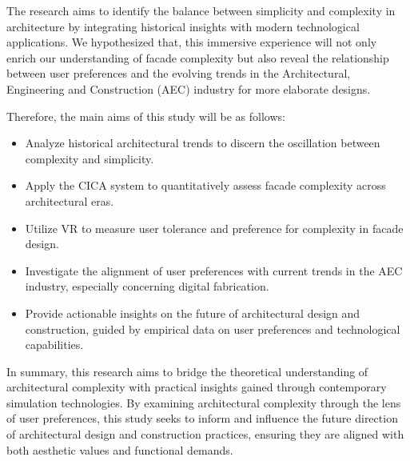 The research aims to identify the balance between simplicity and complexity in architecture by integrating historical insights with modern technological applications.
We hypothesized that, this immersive experience will not only enrich our understanding of facade complexity but also reveal the relationship between user preferences and the evolving trends in the Architectural, Engineering and Construction (AEC) industry for more elaborate designs.

Therefore, the main aims of this study will be as follows:

\begin{itemize}
    \item Analyze historical architectural trends to discern the oscillation between complexity and simplicity.
    \item Apply the CICA system to quantitatively assess facade complexity across architectural eras.
    \item Utilize VR to measure user tolerance and preference for complexity in facade design.
    \item Investigate the alignment of user preferences with current trends in the AEC industry, especially concerning digital fabrication.
    \item Provide actionable insights on the future of architectural design and construction, guided by empirical data on user preferences and technological capabilities.
\end{itemize}



In summary, this research aims to bridge the theoretical understanding of architectural complexity with practical insights gained through contemporary simulation technologies.
By examining architectural complexity through the lens of user preferences, this study seeks to inform and influence the future direction of architectural design and construction practices, ensuring they are aligned with both aesthetic values and functional demands.



